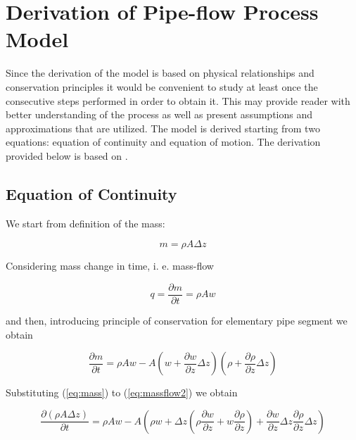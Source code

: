 \chapter{Derivation of Pipe-flow Process Model}

Since the derivation of the model is based on physical relationships and conservation principles it would be convenient to study at least once the consecutive steps performed in order to obtain it. This may provide reader with better understanding of the process as well as present assumptions and approximations that are utilized. The model is derived starting from two equations: equation of continuity and equation of motion. The derivation provided below is based on \cite{billmann_isermann,keerthi_phd}.

\section{Equation of Continuity}

We start from definition of the mass:

\begin{equation}
\label{eq:mass}
m = \rho A \Delta z
\end{equation}

Considering mass change in time, i. e. mass-flow

\begin{equation}
\label{eq:massflow}
q = \frac{\partial m}{\partial t} = \rho A  w
\end{equation}

and then, introducing principle of conservation for elementary pipe segment we obtain

\begin{equation}
\label{eq:massflow2}
\frac{\partial m}{\partial t} = \rho A w - A\left(w + \frac{\partial w}{\partial z}\Delta z\right) \left( \rho + \frac{\partial \rho}{\partial z}\Delta z\right) 
\end{equation}

Substituting (\ref{eq:mass}) to  (\ref{eq:massflow2}) we obtain

\begin{equation}
\label{eq:massflow3}
\frac{\partial \left( \rho A \Delta z \right)}{\partial t} = \rho A  w - A\left( \rho w + \Delta z \left( \rho \frac{\partial w}{\partial z} +w \frac{\partial \rho}{\partial z} \right)+\frac{\partial w}{\partial z} \Delta z  \frac{\partial \rho}{\partial z} \Delta z  \right) 
\end{equation}


